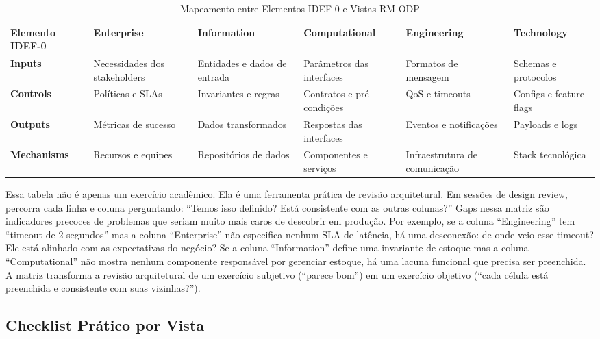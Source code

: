 \begin{table}[htbp]
\centering
\caption{Mapeamento entre Elementos IDEF-0 e Vistas RM-ODP}
\label{tab:idef-odp-mapping}
\begin{tabular}{@{}p{2.8cm}p{2.2cm}p{2.2cm}p{2.2cm}p{2.2cm}p{2.2cm}@{}}
\toprule
\textbf{Elemento IDEF-0} & \textbf{Enterprise} & \textbf{Information} &
\textbf{Computational} & \textbf{Engineering} & \textbf{Technology} \\
\midrule
\textbf{Inputs} & Necessidades dos stakeholders & Entidades e dados de entrada &
Parâmetros das interfaces & Formatos de mensagem & Schemas e protocolos \\
\addlinespace
\textbf{Controls} & Políticas e SLAs & Invariantes e regras & Contratos e
pré-condições & QoS e timeouts & Configs e feature flags \\
\addlinespace
\textbf{Outputs} & Métricas de sucesso & Dados transformados & Respostas das
interfaces & Eventos e notificações & Payloads e logs \\
\addlinespace
\textbf{Mechanisms} & Recursos e equipes & Repositórios de dados & Componentes e
serviços & Infraestrutura de comunicação & Stack tecnológica \\
\bottomrule
\end{tabular}
\end{table}

Essa tabela não é apenas um exercício acadêmico. Ela é uma ferramenta prática de
revisão arquitetural. Em sessões de design review, percorra cada linha e coluna
perguntando: ``Temos isso definido? Está consistente com as outras colunas?''
Gaps nessa matriz são indicadores precoces de problemas que seriam muito mais
caros de descobrir em produção. Por exemplo, se a coluna ``Engineering'' tem
``timeout de 2 segundos'' mas a coluna ``Enterprise'' não especifica nenhum SLA
de latência, há uma desconexão: de onde veio esse timeout? Ele está alinhado com
as expectativas do negócio? Se a coluna ``Information'' define uma invariante de
estoque mas a coluna ``Computational'' não mostra nenhum componente responsável por
gerenciar estoque, há uma lacuna funcional que precisa ser preenchida. A matriz
transforma a revisão arquitetural de um exercício subjetivo (``parece bom'') em
um exercício objetivo (``cada célula está preenchida e consistente com suas
vizinhas?'').

\subsection{Checklist Prático por Vista}

